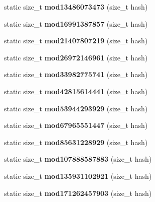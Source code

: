 \begin{DoxyCompactItemize}
\item 
static size\+\_\+t {\bfseries mod13486073473} (size\+\_\+t hash)\label{structska_1_1prime__number__hash__policy_a0ebfe5f0edcff9edbace3f309c2f7c29}

\item 
static size\+\_\+t {\bfseries mod16991387857} (size\+\_\+t hash)\label{structska_1_1prime__number__hash__policy_aa13812835b4868cccf6338de273c512a}

\item 
static size\+\_\+t {\bfseries mod21407807219} (size\+\_\+t hash)\label{structska_1_1prime__number__hash__policy_a9049bd704f91aff562d472fd03820004}

\item 
static size\+\_\+t {\bfseries mod26972146961} (size\+\_\+t hash)\label{structska_1_1prime__number__hash__policy_a5e6dbf8dde39e5ee1b9a91cafe99a5a4}

\item 
static size\+\_\+t {\bfseries mod33982775741} (size\+\_\+t hash)\label{structska_1_1prime__number__hash__policy_a4ad7bf3f54661f5b3bbbdea7cb216394}

\item 
static size\+\_\+t {\bfseries mod42815614441} (size\+\_\+t hash)\label{structska_1_1prime__number__hash__policy_a03529f67b9d1348c343086f547cd2782}

\item 
static size\+\_\+t {\bfseries mod53944293929} (size\+\_\+t hash)\label{structska_1_1prime__number__hash__policy_a0a22d5ef1773d32de1326bbb1947205b}

\item 
static size\+\_\+t {\bfseries mod67965551447} (size\+\_\+t hash)\label{structska_1_1prime__number__hash__policy_a1c5d85541af5627be165543f90a07040}

\item 
static size\+\_\+t {\bfseries mod85631228929} (size\+\_\+t hash)\label{structska_1_1prime__number__hash__policy_a1e8e0cd8957461e4edfca04150b17e0a}

\item 
static size\+\_\+t {\bfseries mod107888587883} (size\+\_\+t hash)\label{structska_1_1prime__number__hash__policy_ae3917bf56f4033d912cbf66c245faee5}

\item 
static size\+\_\+t {\bfseries mod135931102921} (size\+\_\+t hash)\label{structska_1_1prime__number__hash__policy_adea39cb6a9d83bb996a16afaa5c1d96c}

\item 
static size\+\_\+t {\bfseries mod171262457903} (size\+\_\+t hash)\label{structska_1_1prime__number__hash__policy_a4d61d6c942c4243896d9b49880533bb7}


\end{DoxyCompactItemize}
